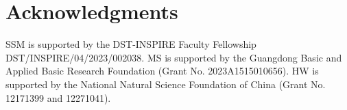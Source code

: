 \documentclass[a4paper,11pt, reqno]{amsart}
\numberwithin{equation}{section}
\theoremstyle{plain}
\newtheorem{corollary}[theorem]{Corollary}
\theoremstyle{definition}
\theoremstyle{remark}
\newtheorem{remark}[theorem]{Remark}
\begin{document}
\section*{Acknowledgments} SSM is supported by the DST-INSPIRE Faculty Fellowship DST/INSPIRE/04/2023/002038. MS is supported by the Guangdong Basic and Applied Basic Research Foundation (Grant No. 2023A1515010656). HW is supported by the National Natural Science Foundation of China (Grant No. 12171399 and 12271041).
	
	
	
	
	
\end{document}
